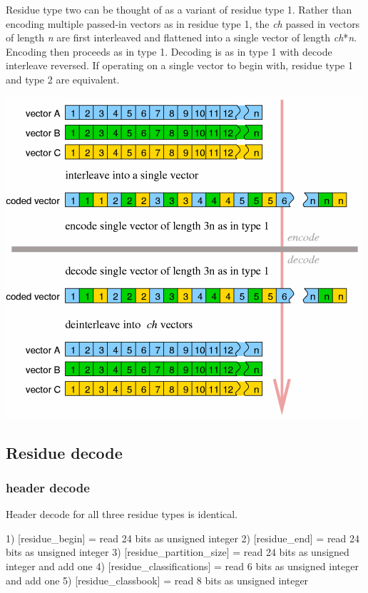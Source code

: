 Residue type two can be thought of as a variant of residue type 1.
Rather than encoding multiple passed-in vectors as in residue type 1,
the \emph{ch} passed in vectors of length \emph{n} are first
interleaved and flattened into a single vector of length
\emph{ch}*\emph{n}.  Encoding then proceeds as in type 1. Decoding is
as in type 1 with decode interleave reversed. If operating on a single
vector to begin with, residue type 1 and type 2 are equivalent.

\begin{center}
\includegraphics[width=\textwidth]{residue2}
\end{center}


\subsection{Residue decode}

\subsubsection{header decode}

Header decode for all three residue types is identical.
\begin{programlisting}
  1) [residue\_begin] = read 24 bits as unsigned integer
  2) [residue\_end] = read 24 bits as unsigned integer
  3) [residue\_partition\_size] = read 24 bits as unsigned integer and add one
  4) [residue\_classifications] = read 6 bits as unsigned integer and add one
  5) [residue\_classbook] = read 8 bits as unsigned integer
\end{programlisting}

